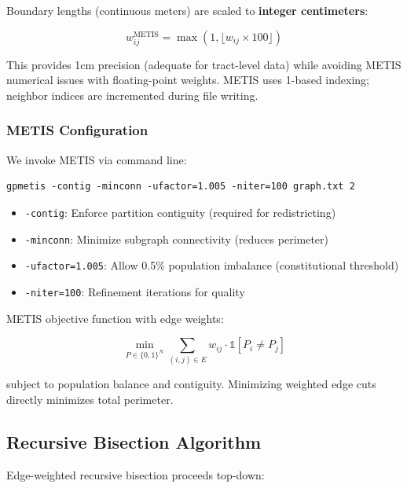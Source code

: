 Boundary lengths (continuous meters) are scaled to \textbf{integer centimeters}:

\begin{equation}
    w_{ij}^{\text{METIS}} = \max(1, \lfloor w_{ij} \times 100 \rfloor)
\end{equation}

This provides 1cm precision (adequate for tract-level data) while avoiding METIS numerical issues with floating-point weights. METIS uses 1-based indexing; neighbor indices are incremented during file writing.

\subsubsection{METIS Configuration}

We invoke METIS via command line:

\begin{verbatim}
gpmetis -contig -minconn -ufactor=1.005 -niter=100 graph.txt 2
\end{verbatim}

\begin{itemize}
    \item \texttt{-contig}: Enforce partition contiguity (required for redistricting)
    \item \texttt{-minconn}: Minimize subgraph connectivity (reduces perimeter)
    \item \texttt{-ufactor=1.005}: Allow 0.5\% population imbalance (constitutional threshold)
    \item \texttt{-niter=100}: Refinement iterations for quality
\end{itemize}

METIS objective function with edge weights:

\begin{equation}
    \min_{P \in \{0,1\}^N} \sum_{(i,j) \in E} w_{ij} \cdot \mathbb{1}[P_i \neq P_j]
\end{equation}

subject to population balance and contiguity. Minimizing weighted edge cuts directly minimizes total perimeter.

\subsection{Recursive Bisection Algorithm}

Edge-weighted recursive bisection proceeds top-down:


